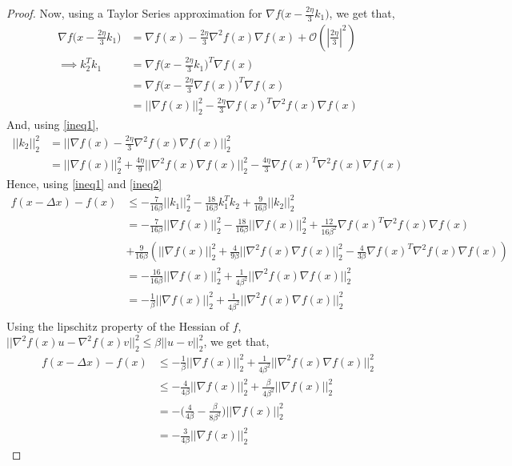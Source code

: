 \begin{proof}
Now, using a Taylor Series approximation for $\nabla f \big( x -  \frac{2\eta}{3}k_1 \big)$, we get that,
\begin{equation}
\begin{aligned}\label{ineq1}
\nabla f \big( x - \frac{2\eta}{3}k_1 \big) &= \nabla f(x) - \frac{2\eta}{3} \nabla^2 f(x) \nabla f(x) + \mathcal{O}( |\frac{2\eta}{3} |^2 ) \\
\implies  k_2^Tk_1 &= \nabla f \big( x - \frac{2\eta}{3}k_1 \big)^T\nabla f(x) \\
 &= \nabla f \big( x - \frac{2\eta}{3}\nabla f(x) \big)^T \nabla f(x) \\
&= || \nabla f(x) ||_2^2 - \frac{2\eta}{3} \nabla f(x)^T \nabla^2 f(x) \nabla f(x)
\end{aligned}
\end{equation}
And, using \eqref{ineq1},
\begin{equation}
\begin{aligned} \label{ineq2}
|| k_2 ||_2^2 &= ||  \nabla f(x) - \frac{2\eta}{3} \nabla^2 f(x) \nabla f(x)  ||_2^2   \\
&= || \nabla f(x)||_2^2 + \frac{4\eta}{9}||\nabla^2 f(x) \nabla f(x)  ||_2^2 - \frac{4\eta}{3} \nabla f(x)^T \nabla^2 f(x) \nabla f(x)
\end{aligned}
\end{equation}
Hence, using \eqref{ineq1} and \eqref{ineq2}
\begin{align*}
f(x - \Delta x) - f(x) & \leq  -\frac{7}{16 \beta}|| k_1 ||_2^2 - \frac{18}{16 \beta}  k_1^{T} k_2  + \frac{9}{16 \beta}|| k_2 ||_2^2 \\
&= -\frac{7}{16 \beta}|| \nabla f(x) ||_2^2 -  \frac{18}{16 \beta} || \nabla f(x) ||_2^2 + \frac{12}{16 \beta^2} \nabla f(x)^T \nabla^2 f(x) \nabla f(x) \\
&+  \frac{9}{16\beta}( || \nabla f(x)||_2^2 + \frac{4}{9\beta}||\nabla^2 f(x) \nabla f(x)  ||_2^2 - \frac{4}{3\beta} \nabla f(x)^T \nabla^2 f(x) \nabla f(x) )  \\
&= -\frac{16}{16 \beta}|| \nabla f(x)||_2^2 + \frac{1}{4 \beta^2}||\nabla^2 f(x) \nabla f(x)  ||_2^2 \\
&= -\frac{1}{\beta} || \nabla f(x)||_2^2 + \frac{1}{4 \beta^2}||\nabla^2 f(x) \nabla f(x)  ||_2^2 \\
\end{align*}
Using the lipschitz property of the Hessian of $f$, $||\nabla^2 f(x) u - \nabla^2 f(x) v||_2^2 \leq \beta || u-v ||_2^2 $, we get that,
\begin{equation}
\begin{aligned}
f(x - \Delta x) - f(x) & \leq -\frac{1}{\beta} || \nabla f(x)||_2^2 + \frac{1}{4\beta^2}||\nabla^2 f(x) \nabla f(x)  ||_2^2 \\
& \leq -\frac{4}{4\beta}|| \nabla f(x) ||_2^2 + \frac{\beta}{4 \beta^2}|| \nabla f(x) ||_2^2 \\
& = -\big( \frac{4}{4\beta} - \frac{\beta}{8\beta^2}   \big)  || \nabla f(x) ||_2^2  \\
&= -\frac{3}{4\beta} || \nabla f(x) ||_2^2
\end{aligned}
\end{equation}
\end{proof}

